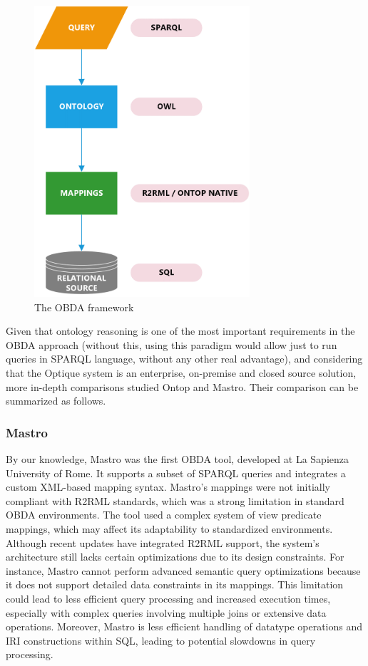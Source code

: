 \begin{figure}[ht]
    \centering
    \includegraphics[width=8cm]{res/data_integration.png}
    \caption{The \ac{OBDA} framework}
    \label{fig:obda_two}
\end{figure}

Given that ontology reasoning is one of the most important requirements in the \ac{OBDA} approach (without this, using this paradigm would allow just to run queries in \ac{SPARQL} language, without any other real advantage), and considering that the Optique system is an enterprise, on-premise and closed source solution, more in-depth comparisons \cite{DBLP:conf/dlog/NamiciG18} studied Ontop and Mastro. Their comparison can be summarized as follows.

\subsubsection{Mastro}
By our knowledge, Mastro \cite{DBLP:journals/semweb/CalvaneseGLLPRRRS11} was the first \ac{OBDA} tool, developed at La Sapienza University of Rome. It supports a subset of \ac{SPARQL} queries and integrates a custom XML-based mapping syntax.
Mastro's mappings were not initially compliant with R2RML standards, which was a strong limitation in standard \ac{OBDA} environments. The tool used a complex system of view predicate mappings, which may affect its adaptability to standardized environments. Although recent updates have integrated R2RML support, the system's architecture still lacks certain optimizations due to its design constraints. For instance, Mastro cannot perform advanced semantic query optimizations because it does not support detailed data constraints in its mappings. This limitation could lead to less efficient query processing and increased execution times, especially with complex queries involving multiple joins or extensive data operations.
Moreover, Mastro is less efficient handling of datatype operations and IRI constructions within \ac{SQL}, leading to potential slowdowns in query processing.

